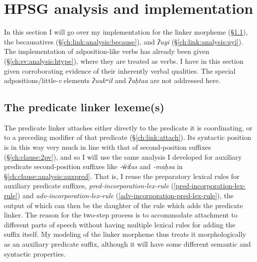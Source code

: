 \section{HPSG analysis and implementation} \label{ch:link:analysis}

In this section I will go over my implementation for the linker morpheme (\S\ref{ch:link:analysis:linker}), the becausatives (\S\ref{ch:link:analysis:because}), and \textit{ʔuyi} (\S\ref{ch:link:analysis:uyi}). The implementation of adposition-like verbs has already been given (\S\ref{ch:sv:analysis:htype}), where they are treated as verbs. I have in this section given corroborating evidence of their inherently verbal qualities. The special adpositions/little-\textit{v} elements \textit{ʔuukʷił} and \textit{ʔuḥtaa} are not addressed here.

\subsection{The predicate linker lexeme(s)} \label{ch:link:analysis:linker}

The predicate linker attaches either directly to the predicate it is coordinating, or to a preceding modifier of that predicate (\S\ref{ch:link:attach}). Its syntactic position is in this way very much in line with that of second-position suffixes (\S\ref{ch:clause:2pv}), and so I will use the same analysis I developed for auxiliary predicate second-position suffixes like \textit{-w̓it̓as} and \textit{-maḥsa} in \S\ref{ch:clause:analysis:auxpred}. That is, I reuse the preparatory lexical rules for auxiliary predicate suffixes, \textit{pred-incorporation-lex-rule} (\ref{pred-incorporation-lex-rule}) and \textit{adv-incorporation-lex-rule} (\ref{adv-incorporation-pred-lex-rule}), the output of which can then be the daughter of the rule which adds the predicate linker. The reason for the two-step process is to accommodate attachment to different parts of speech without having multiple lexical rules for adding the suffix itself. My modeling of the linker morpheme thus treats it morphologically as an auxiliary predicate suffix, although it will have some different semantic and syntactic properties.

